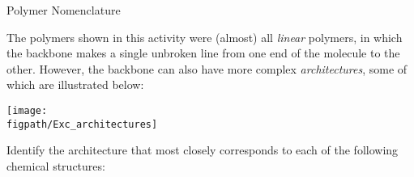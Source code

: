 \begin{activity}{Polymer Nomenclature}
\begin{ctqs}
\begin{enumerate}
				\begin{solution}[1in]
		\studentdisplay{
					~
		}\end{solution}
				
		\end{enumerate}
	
\end{ctqs}


\clearpage
\begin{exercises}

	
		
		
			
			
			
		
		
	
		
	\exercise The polymers shown in this activity were (almost) all \emph{linear} polymers, in which the backbone makes a single unbroken line from one end of the molecule to the other.  However, the backbone can also have more complex \emph{architectures}, some of which are illustrated below:
	
	\vspace{6pt}	\centerline{\texttt{[image: \\figpath/Exc\_architectures]}}
	
		Identify the architecture that most closely corresponds to each of the following chemical structures:
		

\end{exercises}
\end{activity}
